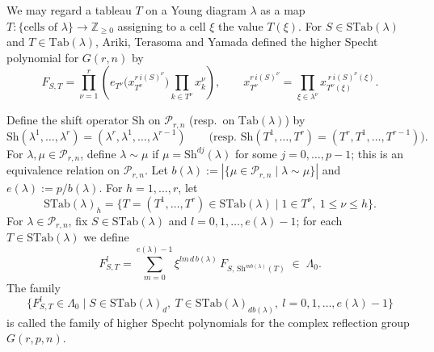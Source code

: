 \documentclass[11pt,a4paper]{article}
\begin{document}
We may regard a tableau $T$ on a Young diagram $\lambda$ as a map
$T : \{\text{cells of } \lambda\} \to \mathbb{Z}_{\ge 0}$ assigning to
a cell $\xi$ the value $T(\xi)$. For $S \in \mathrm{STab}(\lambda)$
and $T \in \mathrm{Tab}(\lambda)$, Ariki, Terasoma and Yamada
\cite{ATY1997} defined the higher Specht polynomial for $G(r,n)$ by
\[
  F_{S,T} = \prod_{\nu=1}^r \left( e_{T^\nu}\big(x^{r\, i(S)^\nu}_{T^\nu}\big)
    \prod_{k \in T^\nu} x_k^\nu \right),
  \qquad
  x^{r\, i(S)^\nu}_{T^\nu} = \prod_{\xi \in \lambda^\nu} x^{\,r\, i(S)^\nu(\xi)}_{T^\nu(\xi)}.
\]

Define the shift operator $\mathrm{Sh}$ on $\mathcal{P}_{r,n}$ (resp.\
on $\mathrm{Tab}(\lambda)$) by
\[
  \mathrm{Sh}(\lambda^1,\dots,\lambda^r) = (\lambda^r,\lambda^1,\dots,\lambda^{r-1})
  \qquad
  \big(\text{resp. } \mathrm{Sh}(T^1,\dots,T^r) = (T^r,T^1,\dots,T^{r-1})\big).
\]
For $\lambda,\mu \in \mathcal{P}_{r,n}$, define $\lambda \sim \mu$ if
$\mu = \mathrm{Sh}^{dj}(\lambda)$ for some $j=0,\dots,p-1$; this is an
equivalence relation on $\mathcal{P}_{r,n}$. Let
$b(\lambda) := |\{\mu \in \mathcal{P}_{r,n} \mid \lambda \sim \mu\}|$
and $e(\lambda) := p/b(\lambda)$. For $h=1,\dots,r$, let
\[
  \mathrm{STab}(\lambda)_h = \{ T=(T^1,\dots,T^r) \in \mathrm{STab}(\lambda) \mid
    1 \in T^\nu,\ 1 \le \nu \le h \}.
\]
For $\lambda \in \mathcal{P}_{r,n}$, fix $S \in \mathrm{STab}(\lambda)$
and $l=0,1,\dots,e(\lambda)-1$; for each $T \in \mathrm{STab}(\lambda)$
we define
\[
  F^l_{S,T} = \sum_{m=0}^{e(\lambda)-1} \xi^{lm\,d\,b(\lambda)}\,
    F_{S,\,\mathrm{Sh}^{mb(\lambda)}(T)}
  \;\in\; \Lambda_0.
\]
The family
\[
  \{ F^l_{S,T} \in \Lambda_0 \mid S \in \mathrm{STab}(\lambda)_d,\
     T \in \mathrm{STab}(\lambda)_{db(\lambda)},\
     l=0,1,\dots,e(\lambda)-1 \}
\]
is called the family of higher Specht polynomials for the complex
reflection group $G(r,p,n)$.
\end{document}
